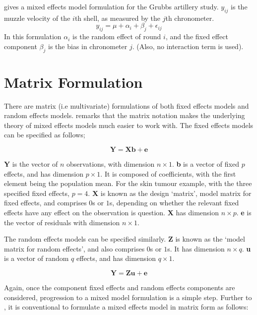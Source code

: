 \documentclass[MAIN.tex]{subfiles}
\begin{document}
\citet{Searle} gives a mixed effects model formulation for the
Grubbs artillery study. $y_{ij}$ is the muzzle velocity of the
$i$th shell, as measured by the $j$th chronometer.
\begin{equation}
y_{ij} = \mu + \alpha_{i} + \beta_{j}  + \epsilon_{ij}
\end{equation}
In this formulation $\alpha_{i}$ is the random effect of round
$i$, and the fixed effect component $\beta_{j}$ is the bias in
chronometer $j$. (Also, no interaction term is used).




\section{Matrix Formulation} There are matrix (i.e multivariate)
formulations of both fixed effects models and random effects
models. \citet{BrownPrescott} remarks that the matrix notation
makes the underlying theory of mixed effects models much easier to
work with. The fixed effects models can be specified as follows;

\begin{equation}
\textbf{Y} = \textbf{Xb} + \textbf{e}
\end{equation}

\textbf{Y} is the vector of $n$ observations, with dimension $n
\times 1$. \textbf{b} is a vector of fixed $p$ effects, and has
dimension $p \times 1$. It is composed of coefficients, with the
first element being the population mean. For the skin tumour
example, with the three specified fixed effects, $p=4$. \textbf{X}
is known as the design `matrix', model matrix for fixed effects,
and comprises $0$s or $1$s, depending on whether the relevant
fixed effects have any effect on the observation is question.
\textbf{X} has dimension $n \times p$. \textbf{e} is the vector of
residuals with dimension $n \times 1$.

The random effects models can be specified similarly. \textbf{Z}
is known as the `model matrix for random effects', and also
comprises $0$s or $1$s. It has dimension $n \times q$. \textbf{u}
is a vector of random $q$ effects, and has dimension $q \times 1$.

\begin{equation}
\textbf{Y} = \textbf{Zu} + \textbf{e}
\end{equation}

Again, once the component fixed effects and random effects
components are considered, progression to a mixed model
formulation is a simple step. Further to \citet{LW82}, it is
conventional to formulate a mixed effects model in matrix form as
follows:
\end{document}
